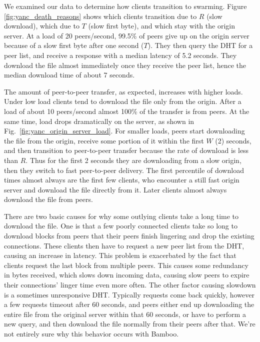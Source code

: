 We examined our data to determine how clients transition to swarming.  
Figure \ref{fig:yanc_death_reasons} shows which clients transition due to $R$ (slow download), which due to $T$ (slow first byte),
and which stay with the origin server.  At a load of 20 peers/second, 99.5\% 
of peers give up on the origin server because of a slow first byte after one second ($T$). They then query the 
DHT for a peer list, and receive a response with a median latency of 5.2 seconds.  They download the file almost 
immediately once they receive the peer list, hence the median download time of about 7 seconds. 

The amount of peer-to-peer transfer, as expected, increases with higher loads. Under low load clients tend to download 
the file only from the origin.  After a load of about 10 peers/second almost 100\% of the transfer is from 
peers.  At the same time, load drops dramatically on the server, as shown in Fig.~\ref{fig:yanc_origin_server_load}.
For smaller loads, peers start downloading the file from the origin, 
receive some portion of it within the first $W$ (2) seconds, and then
transition to peer-to-peer transfer because the rate of download is less than $R$.  
Thus for the first 2 seconds they are downloading from a slow origin, then they switch to fast peer-to-peer delivery.
The first percentile of download times almost always are the first few clients, who encounter a still fast origin server and download the file directly from it.
Later clients almost always download the file from peers.

There are two basic causes for why some outlying clients take a long time to download the file.  One is that a few poorly connected clients take so long to download blocks from peers
that their peers finish lingering and drop the existing connections.  These clients then have to request a new 
peer list from the DHT, causing an increase in latency.  This problem is exacerbated by the fact that clients request 
the last block from multiple peers.  This causes 
some redundancy in bytes received, which slows down incoming data, causing slow peers to expire their connections' linger time even more often.
The other factor causing slowdown is a sometimes unresponsive DHT. Typically requests come back quickly, however a few requests timeout after 60 seconds, 
and peers either end up downloading the entire file from the original server within that 60 seconds, or have to perform a new 
query, and then download the file normally from their peers after that.  We're not entirely sure why this behavior occurs with Bamboo.

